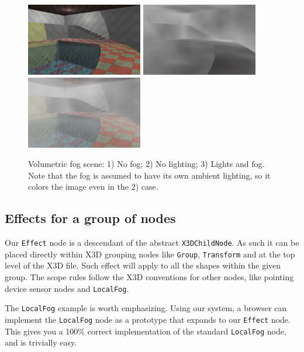 \documentclass{egpubl}
\begin{document}
\begin{figure}[t]
  \centering
  \includegraphics[width=2.0in]{volumetric_animated_fog_no_fog}
  \includegraphics[width=2.0in]{volumetric_animated_fog_no_light}
  \includegraphics[width=2.0in]{volumetric_animated_fog_all}
  \caption{Volumetric fog scene: 1) No fog; 2) No lighting; 3) Lights and fog.
Note that the fog is assumed to have its own ambient lighting,
so it colors the image even in the 2) case.}
  \label{fig_fog}
\end{figure}

\subsection{Effects for a group of nodes}

Our \texttt{Effect} node is a descendant of the abstract \texttt{X3DChildNode}.
As such it can be placed directly within X3D grouping nodes like
\texttt{Group}, \texttt{Transform} and at the top level of the X3D file.
Such effect will apply to all the shapes within the given group.
The scope rules follow the X3D conventions for other nodes,
like pointing device sensor nodes and \texttt{LocalFog}.

The \texttt{LocalFog} example is worth emphasizing. Using our system,
a browser can implement the \texttt{LocalFog} node as a prototype
that expands to our \texttt{Effect} node. This gives you a 100\% correct
implementation of the standard \texttt{LocalFog} node, and is trivially easy.
\end{document}

